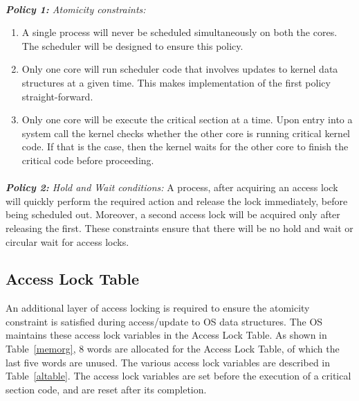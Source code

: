 \documentclass[12pt]{report}
\begin{document}
\paragraph{}
\emph{\textbf{Policy 1:} Atomicity constraints:}
\begin{enumerate}
    \item A single process will never be scheduled simultaneously on both the cores. The scheduler will be designed to ensure this policy.
    \item Only one core will run scheduler code that involves updates to kernel data structures at a given time. This makes implementation of the first policy straight-forward.
    \item Only one core will be execute the critical section at a time. Upon entry into a system call the kernel checks whether the other core is running critical kernel code. If that is the case, then the kernel waits for the other core to finish the critical code before proceeding.
\end{enumerate}

\paragraph{}
\emph{\textbf{Policy 2:} Hold and Wait conditions:}
\newline
A process, after acquiring an access lock will quickly perform the required action and release the lock immediately, before being scheduled out. Moreover, a second access lock will be acquired only after releasing the first. These constraints ensure that there will be no hold and wait or circular wait for access locks.

\subsection{Access Lock Table}
An additional layer of access locking is required to ensure the atomicity constraint is satisfied during access/update to OS data structures. The OS maintains these access lock variables in the Access Lock Table. As shown in Table~\ref{memorg}, 8 words are allocated for the Access Lock Table, of which the last five words are unused. The various access lock variables are described in Table~\ref{altable}. The access lock variables are set before the execution of a critical section code, and are reset after its completion.
\end{document}
